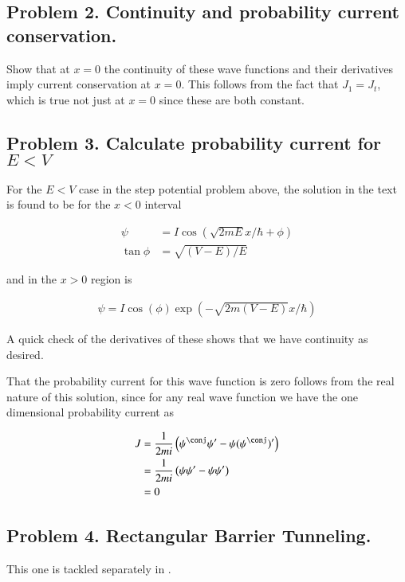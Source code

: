 \subsection{Problem 2.  Continuity and probability current conservation. }

Show that at $x=0$ the continuity of these wave functions and their derivatives 
imply current conservation at $x=0$.  This follows from the fact that $J_1 = J_t$, which is
true not just at $x=0$ since these are both constant.

\subsection{Problem 3.  Calculate probability current for $E<V$ }

For the $E<V$ case in the step potential problem above, the solution in the 
text is found to be for the $x<0$ interval

\begin{align*}
\psi &= I \cos\left( \sqrt{2mE} x/\hbar + \phi \right) \\
\tan\phi &= \sqrt{(V-E)/E}
\end{align*}

and in the $x>0$ region is

\begin{align*}
\psi = I \cos\left( \phi \right) \exp\left( -\sqrt{2m(V-E)} x/\hbar \right)
\end{align*}

A quick check of the derivatives of these shows that we have continuity as desired.

That the probability current for this wave function is zero follows from the real nature of this solution, since for any real
wave function we have the one dimensional probability current as

\begin{align*}
J 
&= \inv{2mi}\left( \psi^\conj \psi' - \psi (\psi^\conj)' \right) \\
&= \inv{2mi}\left( \psi \psi' - \psi \psi' \right) \\
&= 0
\end{align*}

\subsection{Problem 4. Rectangular Barrier Tunneling. }

This one is tackled separately in \cite{PJqmBarrier}.

